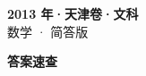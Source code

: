 \documentclass[zihao=-4, a4paper]{ctexart}
\begin{document}
\begin{center}
  {\Large\bfseries 2013 年·天津卷·文科}\\[4pt]
  {\large 数学 · 简答版}
\end{center}
\medskip
{}

\clearpage
{}
\begin{center}{\Large\bfseries 答案速查}\end{center}
\medskip

\end{document}
